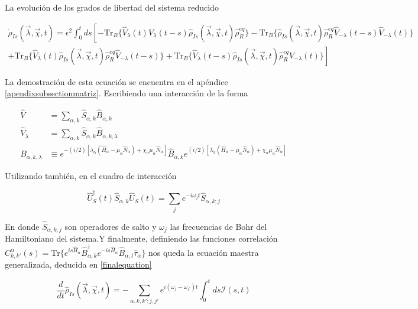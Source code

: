 La evolución de los grados de libertad del sistema reducido

\begin{multline}
    \dot{\rho}_{Is}(\vec{\lambda},\vec{\chi},t) =  \epsilon^{2}\int_{0}^{t}ds \left[- \text{Tr}_{B}\{\hat{V}_{\lambda}(t)\hat{V}_{\lambda}(t-s)\hat{\rho}_{Is}(\vec{\lambda},\vec{\chi},t)\hat{\rho}^{eq}_{R} \} - \text{Tr}_{B}\{\hat{\rho}_{Is}(\vec{\lambda},\vec{\chi},t)\hat{\rho}^{eq}_{R}\hat{V}_{-\lambda}(t-s)\hat{V}_{-\lambda}(t) \} \right.\\
    \left. + \text{Tr}_{B}\{\hat{V}_{\lambda}(t)\hat{\rho}_{Is}(\vec{\lambda},\vec{\chi},t)\hat{\rho}^{eq}_{R}\hat{V}_{-\lambda}(t-s) \} + \text{Tr}_{B}\{ \hat{V}_{\lambda}(t-s)\hat{\rho}_{Is}(\vec{\lambda},\vec{\chi},t)\hat{\rho}^{eq}_{R}\hat{V}_{-\lambda}(t) \}  \right]
\label{ecmaestraVlambda}
\end{multline}

La demostración de esta ecuación se encuentra en el apéndice \ref{apendixsubsectionmatriz}. Escribiendo una interacción de la forma

\begin{align*}
    \hat{V} & = \sum_{\alpha,k}\hat{S}_{\alpha,k}\hat{B}_{\alpha,k} \\
    \hat{V}_{\lambda} & = \sum_{\alpha,k}\hat{S}_{\alpha,k}\hat{B}_{\alpha,k,\lambda} \\
    B_{\alpha,k,\lambda} & \equiv e^{-(i/2)[\lambda_{\alpha}(\hat{H}_{\alpha} - \mu_{\alpha}\hat{N}_{\alpha}) + \chi_{\alpha}\mu_{\alpha}\hat{N}_{\alpha}]}\hat{B}_{\alpha,k}e^{(i/2)[\lambda_{\alpha}(\hat{H}_{\alpha} - \mu_{\alpha}\hat{N}_{\alpha}) + \chi_{\alpha}\mu_{\alpha}\hat{N}_{\alpha}]}   
\end{align*}

Utilizando también, en el cuadro de interacción

\begin{equation*}
    \hat{U}^{\dagger}_{S}(t)\hat{S}_{\alpha,k}\hat{U}_{S}(t) = \sum_{j}e^{-i\omega_{j}t}\hat{S}_{\alpha,k;j}
\end{equation*}

En donde $\hat{S}_{\alpha,k;j}$ son operadores de salto y $\omega_{j}$ las frecuencias de Bohr del Hamiltoniano del sistema.Y finalmente, definiendo las funciones correlación $C^{\alpha}_{k,k'}(s) = \text{Tr}\{e^{is\hat{H}_{\alpha} }\hat{B}^{\dagger}_{\alpha,k}e^{-is\hat{H}_{\alpha} }\hat{B}_{\alpha,t}\hat{\tau}_{\alpha}\}$ nos queda la ecuación maestra generalizada, deducida en \ref{finalequation}

\begin{equation}
    \frac{d}{dt}\hat{\rho}_{Is}(\vec{\lambda},\vec{\chi},t) = - \sum_{\alpha,k,k';j,j'}e^{i(\omega_{j}-\omega_{j'})t}\int_{0}^{t}ds \mathcal{I}(s,t) 
\label{ecmaestrafinal}
\end{equation}

